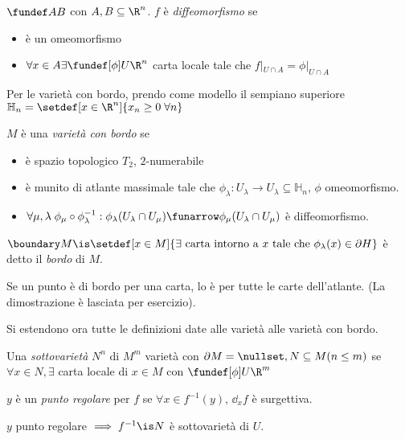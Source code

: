 \begin{defn}
$\fundef AB$ con $A,B\subseteq \R^n$. $f$ è \emph{diffeomorfismo} se
\begin{itemize}
 \item è un omeomorfismo
 \item $\forall x\in A \exists \fundef[\phi] U\R^n$ carta locale tale che $f|_{U\cap A}=\phi|_{U\cap A}$
\end{itemize}
\end{defn}
Per le varietà con bordo, prendo come modello il sempiano superiore $\mathbb H_n=\setdef[x\in\R^n]{x_n\ge 0 \; \forall n}$
\begin{defn}
 $M$ è una \emph{varietà con bordo} se 
 \begin{itemize}
  \item è spazio topologico $T_2$, $2$-numerabile
  \item è munito di atlante massimale tale che $\phi_{\lambda}: U_{\lambda}\rightarrow U_{\lambda}\subseteq\mathbb H_n$, $\phi$ omeomorfismo.
  \item $\forall \mu,\lambda\; \phi_{\mu}\circ\phi_{\lambda}^{-1}:\phi_{\lambda}(U_{\lambda}\cap U_{\mu})\funarrow\phi_{\mu}(U_{\lambda}\cap U_{\mu})$ è diffeomorfismo.
 \end{itemize}
\end{defn}
\begin{defn}[Bordo]
$\boundary M\is \setdef[x\in M]{\exists\text{ carta intorno a }x\text{ tale che } \phi_{\lambda}(x) \in \partial H}$ è detto il \emph{bordo} di $M$.
\end{defn}
\begin{prop}
 Se un punto è di bordo per una carta, lo è per tutte le carte dell'atlante. (La dimostrazione è lasciata per esercizio).
\end{prop}
Si estendono ora tutte le definizioni date alle varietà alle varietà con bordo.
\begin{defn}[Sottovarietà]
 Una \emph{sottovarietà} $N^n$ di $M^m$ varietà con $\partial M = \nullset, N\subseteq M (n\le m)$ se $\forall x\in N, \exists$ carta locale di $x \in M$ con $\fundef[\phi] U\R^m $
\end{defn}
\begin{defn}
 $y$ è un \emph{punto regolare} per $f$ se $\forall x\in f^{-1}(y)$, $\dd_xf$ è surgettiva.
\end{defn}
\begin{prop}
 $y$ punto regolare $\implies f^{-1}\is N$ è sottovarietà di $U$.
\end{prop}
